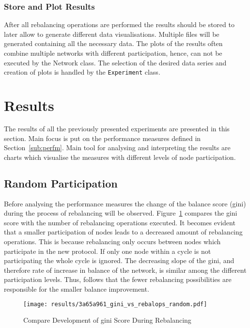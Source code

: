 \documentclass[final]{fhnwreport}       %
\begin{document}
\subsubsection{Store and Plot Results}
After all rebalancing operations are performed the results should be stored to later allow to generate different data visualisations. Multiple files will be generated containing all the necessary data. The plots of the results often combine multiple networks with different participation, hence, can not be executed by the Network class. The selection of the desired data series and creation of plots is handled by the \texttt{Experiment} class.

\section{Results}\label{sec:result}
The results of all the previously presented experiments are presented in this section. Main focus is put on the performance measures defined in Section~\ref{sub:perfm}. Main tool for analysing and interpreting the results are charts which visualise the measures with different levels of node participation.

\subsection{Random Participation}
Before analysing the performance measures the change of the balance score (\gls{gini}) during the process of rebalancing will be observed. Figure~\ref{fig:gini_rebal_rand} compares the \gls{gini} score with the number of rebalancing operations executed. It becomes evident that a smaller participation of nodes leads to a decreased amount of rebalancing operations. This is because rebalancing only occurs between nodes which participate in the new protocol. If only one node within a cycle is not participating the whole cycle is ignored. The decreasing slope of the \gls{gini}, and therefore rate of increase in balance of the network, is similar among the different participation levels. Thus, follows that the fewer rebalancing possibilities are responsible for the smaller balance improvement. 

\begin{figure}[H]
\centering
\texttt{[image: results/3a65a961\_gini\_vs\_rebalops\_random.pdf]}
\caption{Compare Development of \gls{gini} Score During Rebalancing}
\label{fig:gini_rebal_rand}
\end{figure}
\end{document}
